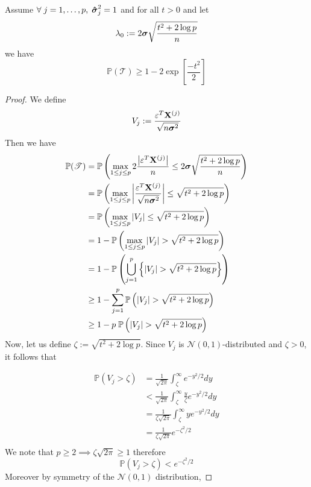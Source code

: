\begin{lemma}
    \label{lemma: value for lambda_0}
    Assume \(\forall \; j = 1, \ldots, p, \; \boldsymbol{\hat{\sigma}}_j^2 = 1 \) and for all $t > 0$ and let
    \[
        \lambda_{0}:=2 \boldsymbol{\sigma} \sqrt{\frac{t^{2}+2 \log p}{n}}
    \]
    we have
    \[
        \mathbb{P}(\mathscr{T}) \geq 1-2 \exp \left[ \frac{-t^{2}}{2} \right]
    \]
\end{lemma}
\begin{proof}
    We define
    \[
        V_{j} := \frac{\varepsilon^{T} \mathbf{X}^{(j)}}{\sqrt{n \boldsymbol{\sigma}^{2}}}
    \]
    Then we have
    \begin{align}
        \nonumber
        \mathbb{P}(\mathscr{T})
         & = \mathbb{P} \left( \max _{1 \leq j \leq p} 2 \frac{\left| \varepsilon^{T} \mathbf{X}^{(j)}\right|}{n} \leq 2 \boldsymbol{\sigma} \sqrt{\frac{t^{2}+2 \log p}{n}}  \right) \\
        \nonumber
         & =
        \mathbb{P} \left( \max _{1 \leq j \leq p} \left| \frac{\varepsilon^{T} \mathbf{X}^{(j)}}{\sqrt{n \boldsymbol{\sigma}^{2}}} \right| \leq \sqrt{t^{2}+2 \log p}  \right)        \\
        \nonumber
         & =
        \mathbb{P} \left( \max _{1 \leq j \leq p} | V_{j} | \leq \sqrt{t^{2}+2 \log p}  \right)                                                                \\
        \nonumber
         & = 1 - \mathbb{P} \left( \max _{1 \leq j \leq p} | V_{j} | > \sqrt{t^{2}+2 \log p}  \right)                                                          \\
        \nonumber
         & = 1 - \mathbb{P} \left( \bigcup_{j = 1}^{p} \left\{ | V_{j} | > \sqrt{t^{2}+2 \log p}  \right\} \right)                                             \\
        \nonumber
         & \geq 1 - \sum_{j = 1}^{p} \mathbb{P} \left( | V_{j} | > \sqrt{t^{2}+2 \log p}  \right)                                                              \\
        \label{eqn: proof lemma 6.2.}
         & \geq 1 - p \; \mathbb{P} \left( | V_{j} | > \sqrt{t^{2}+2 \log p}  \right)
    \end{align}
    Now, let us define $\zeta := \sqrt{t^{2}+2 \log p}$. Since $V_j$ is $\mathscr{N} (0,1)$-distributed and $\zeta > 0$, it follows that

    \begin{align*}
        \mathbb{P}(V_j > \zeta) & = \frac{1}{\sqrt{2\pi}} \int_\zeta^{\infty} e^{-y^2/2} dy                   \\
                                & < \frac{1}{\sqrt{2\pi}} \int_\zeta^{\infty} \frac{y}{\zeta} e^{-y^2 / 2} dy \\
                                & = \frac{1}{\zeta \sqrt{2\pi}} \int_\zeta^{\infty} y e^{-y^2 / 2} dy         \\
                                & = \frac{1}{\zeta\sqrt{2\pi}} e^{-\zeta^2/2}                                 \\
    \end{align*}
    We note that $p \geq 2 \implies \zeta \sqrt{2 \pi} \geq 1$ therefore
    \[
        \mathbb{P}(V_j > \zeta) <  e^{-\zeta^2/2}
    \]
    Moreover by symmetry of the $\mathscr{N} (0,1)$ distribution,


\end{proof}
